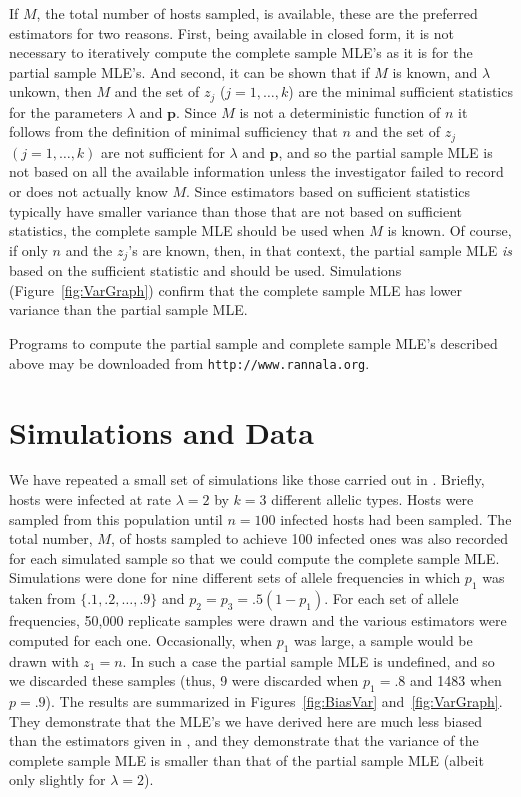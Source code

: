 \documentclass[12pt,titlepage]{article}
\newcommand{\bp}{\mathbf{p}}
\begin{document}
 If $M$, the total number of hosts sampled, is available, these are
the preferred estimators for two reasons.  First, being available in closed
form, it is not necessary to iteratively compute the complete sample MLE's   as it is for
the partial sample MLE's.  And second, it can be shown that if $M$ is known, and
$\lambda$ unkown, then $M$ and the set of $z_j$ ($j=1,\ldots,k$) are the minimal
sufficient statistics for the parameters
$\lambda$ and $\bp$. Since $M$ is not a deterministic function of $n$ it follows from
the definition of minimal sufficiency that
$n$ and the set of $z_j$ $(j=1,\ldots,k)$ are not sufficient for $\lambda$
and $\bp$,  and so the partial sample MLE is not based on all the available information
unless the investigator failed to record or does not actually know $M$.  Since
estimators based on sufficient statistics typically have smaller variance than those
that are not based on sufficient statistics, the complete sample MLE should be used when
$M$ is known.  Of course, if only $n$ and the $z_j$'s are known, then, in that context,
the partial sample MLE {\em is} based on the sufficient statistic and should be used. 
Simulations (Figure~\ref{fig:VarGraph}) confirm that the complete sample MLE has lower
variance than the partial sample MLE.

Programs to compute the partial sample and complete sample MLE's described above may
be downloaded from \texttt{http://www.rannala.org}.  

\section{Simulations and Data}
We have repeated a small set of simulations like those carried out in
.   Briefly, hosts were infected at rate $\lambda=2$ by $k=3$
different allelic types.  Hosts
were sampled from this population until $n=100$ infected hosts had been sampled.  The
total number,
$M$, of hosts sampled to achieve 100 infected ones was also recorded for each simulated
sample so that we could compute the complete sample MLE.  Simulations were done for nine
different sets of allele frequencies in which 
$p_1$ was taken from $\{.1,.2,\ldots,.9\}$ and $p_2=p_3=.5(1-p_1)$.  For each set of
allele frequencies, 50,000 replicate samples were drawn and the various estimators were
computed for each one.  Occasionally, when $p_1$ was large, a sample would be
drawn with $z_1 = n$.  In such a case the partial sample MLE is undefined, and
so we discarded these samples (thus, 9 were discarded when $p_1=.8$ and 1483 when
$p=.9$).  The results are summarized in Figures~\ref{fig:BiasVar}
and~\ref{fig:VarGraph}.  They demonstrate that the MLE's we have derived here are much
less biased than the estimators given in , and they demonstrate
that the variance of the complete sample MLE is smaller than that of the partial sample
MLE (albeit only slightly for $\lambda=2$). 
\end{document}
